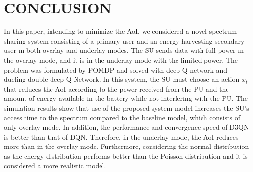 \documentclass[journal]{IEEEtran}
\begin{document}
	\section{CONCLUSION}
		In this paper, intending to minimize the AoI, we considered a novel spectrum sharing system consisting of a primary user and an energy harvesting secondary user in both overlay and underlay modes. The SU sends data with full power in the overlay mode, and it is in the underlay mode with the limited power. The problem was formulated by POMDP and solved with deep Q-network and dueling double deep Q-Network. In this system, the SU must choose an action $x_t$ that reduces the AoI according to the power received from the PU and the amount of energy available in the battery while not interfering with the PU. The simulation results show that use of the proposed system model increases the SU's access time to the spectrum compared to the baseline model, which consists of only overlay mode. In addition, the performance and convergence speed of D3QN is better than that of DQN. Therefore, in the underlay mode, the AoI reduces more than in the overlay mode. Furthermore, considering the normal distribution as the energy distribution performs better than the Poisson distribution and it is considered a more realistic model.





\end{document}
